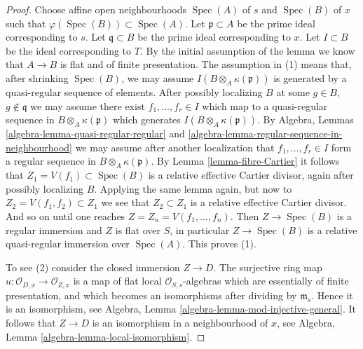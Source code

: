 \documentclass[10pt,a4paper]{amsart}
\theoremstyle{plain}
\theoremstyle{definition}
\theoremstyle{remark}
\numberwithin{equation}{subsection}
\def\Spec{\mathop{\mathrm{Spec}}}
\begin{document}
\begin{proof}
Choose affine open neighbourhoods $\Spec(A)$ of $s$ and
$\Spec(B)$ of $x$ such that
$\varphi(\Spec(B)) \subset \Spec(A)$.
Let $\mathfrak p \subset A$ be the prime ideal corresponding to $s$.
Let $\mathfrak q \subset B$ be the prime ideal corresponding to $x$.
Let $I \subset B$ be the ideal corresponding to $T$.
By the initial assumption of the lemma we know that
$A \to B$ is flat and of finite presentation.
The assumption in (1) means that, after shrinking $\Spec(B)$, we may
assume $I(B \otimes_A \kappa(\mathfrak p))$ is generated by a
quasi-regular sequence of elements. After possibly localizing $B$
at some $g \in B$, $g \not \in \mathfrak q$ we may assume there
exist $f_1, \ldots, f_r \in I$ which map to a quasi-regular
sequence in $B \otimes_A \kappa(\mathfrak p)$ which generates
$I(B \otimes_A \kappa(\mathfrak p))$. By
Algebra, Lemmas \ref{algebra-lemma-quasi-regular-regular} and
\ref{algebra-lemma-regular-sequence-in-neighbourhood}
we may assume after another localization that
$f_1, \ldots, f_r \in I$ form a regular
sequence in $B \otimes_A \kappa(\mathfrak p)$. By
Lemma \ref{lemma-fibre-Cartier}
it follows that $Z_1 = V(f_1) \subset \Spec(B)$
is a relative effective Cartier divisor, again after possibly
localizing $B$. Applying the same lemma again, but now to
$Z_2 = V(f_1, f_2) \subset Z_1$ we see that $Z_2 \subset Z_1$
is a relative effective Cartier divisor. And so on until one
reaches $Z = Z_n = V(f_1, \ldots, f_n)$. Then
$Z \to \Spec(B)$ is a regular immersion and $Z$ is
flat over $S$, in particular $Z \to \Spec(B)$ is
a relative quasi-regular immersion over $\Spec(A)$.
This proves (1).

\medskip\noindent
To see (2) consider the closed immersion $Z \to D$. The surjective
ring map $u : \mathcal{O}_{D, x} \to \mathcal{O}_{Z, x}$
is a map of flat local $\mathcal{O}_{S, s}$-algebras which
are essentially of finite presentation, and which becomes an
isomorphisms after dividing by $\mathfrak m_s$. Hence it is
an isomorphism, see
Algebra, Lemma \ref{algebra-lemma-mod-injective-general}.
It follows that $Z \to D$ is an isomorphism in a neighbourhood
of $x$, see
Algebra, Lemma \ref{algebra-lemma-local-isomorphism}.


\end{proof}
\end{document}
